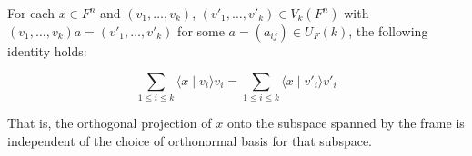 For each $x \in F^n$ and $(v_1, \ldots, v_k)$, $(v'_1, \ldots, v'_k) \in V_k(F^n)$ with $(v_1, \ldots, v_k) a = (v'_1, \ldots, v'_k)$ for some $a = (a_{ij}) \in U_F(k)$, the following identity holds:

$$\sum_{1 \leq i \leq k} \langle x \mid v_i \rangle v_i = \sum_{1 \leq i \leq k} \langle x \mid v'_i \rangle v'_i$$

That is, the orthogonal projection of $x$ onto the subspace spanned by the frame is independent of the choice of orthonormal basis for that subspace.
